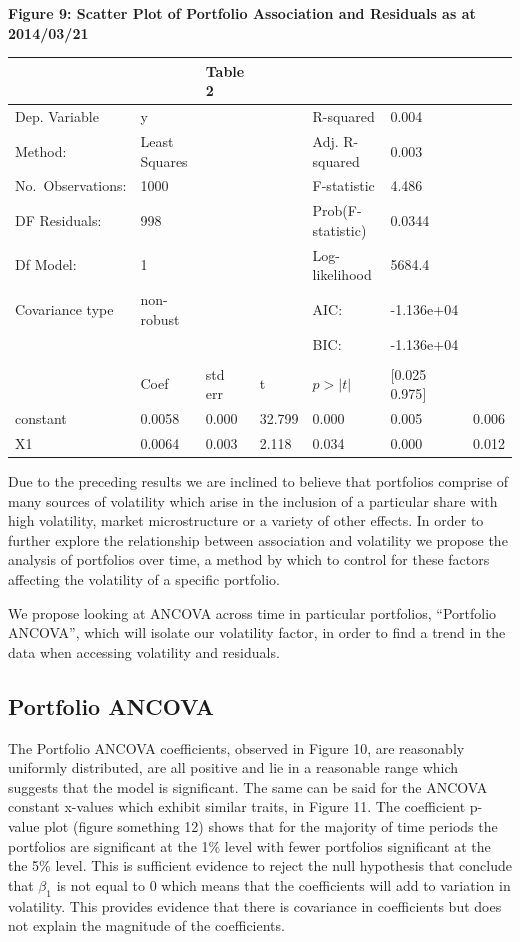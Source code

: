\documentclass[11pt]{article}
\begin{document}
\textbf{Figure 9: Scatter Plot of Portfolio Association and Residuals as
at 2014/03/21}

\begin{longtable}[]{@{}lllllll@{}}
\toprule
& & \textbf{Table 2} & & & &\tabularnewline
\midrule
\endhead
Dep. Variable & y & & & R-squared & 0.004 &\tabularnewline
Method: & Least Squares & & & Adj. R-squared & 0.003 &\tabularnewline
No.~Observations: & 1000 & & & F-statistic & 4.486 &\tabularnewline
DF Residuals: & 998 & & & Prob(F-statistic) & 0.0344 &\tabularnewline
Df Model: & 1 & & & Log-likelihood & 5684.4 &\tabularnewline
Covariance type & non-robust & & & AIC: & -1.136e+04 &\tabularnewline
& & & & BIC: & -1.136e+04 &\tabularnewline
& & & & & &\tabularnewline
& Coef & std err & t & \(p>|t|\) & {[}0.025 0.975{]} &\tabularnewline
constant & 0.0058 & 0.000 & 32.799 & 0.000 & 0.005 &
0.006\tabularnewline
X1 & 0.0064 & 0.003 & 2.118 & 0.034 & 0.000 & 0.012\tabularnewline
\bottomrule
\end{longtable}

Due to the preceding results we are inclined to believe that portfolios
comprise of many sources of volatility which arise in the inclusion of a
particular share with high volatility, market microstructure or a
variety of other effects. In order to further explore the relationship
between association and volatility we propose the analysis of portfolios
over time, a method by which to control for these factors affecting the
volatility of a specific portfolio.

We propose looking at ANCOVA across time in particular portfolios,
``Portfolio ANCOVA'', which will isolate our volatility factor, in order
to find a trend in the data when accessing volatility and residuals.

\hypertarget{portfolio-ancova}{%
\subsection{Portfolio ANCOVA}\label{portfolio-ancova}}

The Portfolio ANCOVA coefficients, observed in Figure 10, are reasonably
uniformly distributed, are all positive and lie in a reasonable range
which suggests that the model is significant. The same can be said for
the ANCOVA constant x-values which exhibit similar traits, in Figure 11.
The coefficient p-value plot (figure something 12) shows that for the
majority of time periods the portfolios are significant at the 1\% level
with fewer portfolios significant at the the 5\% level. This is
sufficient evidence to reject the null hypothesis that conclude that
\(\beta_{1}\) is not equal to 0 which means that the coefficients will
add to variation in volatility. This provides evidence that there is
covariance in coefficients but does not explain the magnitude of the
coefficients.
\end{document}
